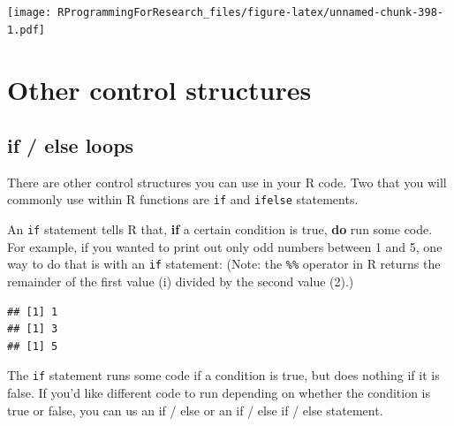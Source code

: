 \documentclass[]{book}
\makeatletter
\newenvironment{Shaded}{\begin{snugshade}}{\end{snugshade}}
\newcommand{\KeywordTok}[1]{\textcolor[rgb]{0.13,0.29,0.53}{\textbf{#1}}}
\newcommand{\DecValTok}[1]{\textcolor[rgb]{0.00,0.00,0.81}{#1}}
\newcommand{\StringTok}[1]{\textcolor[rgb]{0.31,0.60,0.02}{#1}}
\newcommand{\ControlFlowTok}[1]{\textcolor[rgb]{0.13,0.29,0.53}{\textbf{#1}}}
\newcommand{\OperatorTok}[1]{\textcolor[rgb]{0.81,0.36,0.00}{\textbf{#1}}}
\newcommand{\NormalTok}[1]{#1}
\newenvironment{kframe}{%
\medskip{}
\setlength{\fboxsep}{.8em}
 \def\at@end@of@kframe{}%
 \ifinner\ifhmode%
  \def\at@end@of@kframe{\end{minipage}}%
  \begin{minipage}{\columnwidth}%
 \fi\fi%
 \def\FrameCommand##1{\hskip\@totalleftmargin \hskip-\fboxsep
 \colorbox{shadecolor}{##1}\hskip-\fboxsep
     \hskip-\linewidth \hskip-\@totalleftmargin \hskip\columnwidth}%
 \MakeFramed {\advance\hsize-\width
   \@totalleftmargin\z@ \linewidth\hsize
   \@setminipage}}%
 {\par\unskip\endMakeFramed%
 \at@end@of@kframe}
\renewenvironment{Shaded}{\begin{kframe}}{\end{kframe}}
\theoremstyle{definition}
\theoremstyle{definition}
\theoremstyle{definition}
\theoremstyle{remark}
\makeatother
\begin{document}
\texttt{[image: RProgrammingForResearch\_files/figure-latex/unnamed-chunk-398-1.pdf]}

\section{Other control structures}\label{other-control-structures}

\subsection{if / else loops}\label{if-else-loops}

There are other control structures you can use in your R code. Two that
you will commonly use within R functions are \texttt{if} and
\texttt{ifelse} statements. \bigskip

An \texttt{if} statement tells R that, \textbf{if} a certain condition
is true, \textbf{do} run some code. For example, if you wanted to print
out only odd numbers between 1 and 5, one way to do that is with an
\texttt{if} statement: (Note: the \texttt{\%\%} operator in R returns
the remainder of the first value (i) divided by the second value (2).)

\begin{Shaded}
\end{Shaded}

\begin{verbatim}
## [1] 1
## [1] 3
## [1] 5
\end{verbatim}

The \texttt{if} statement runs some code if a condition is true, but
does nothing if it is false. If you'd like different code to run
depending on whether the condition is true or false, you can us an if /
else or an if / else if / else statement.

\begin{Shaded}
\end{Shaded}
\end{document}
